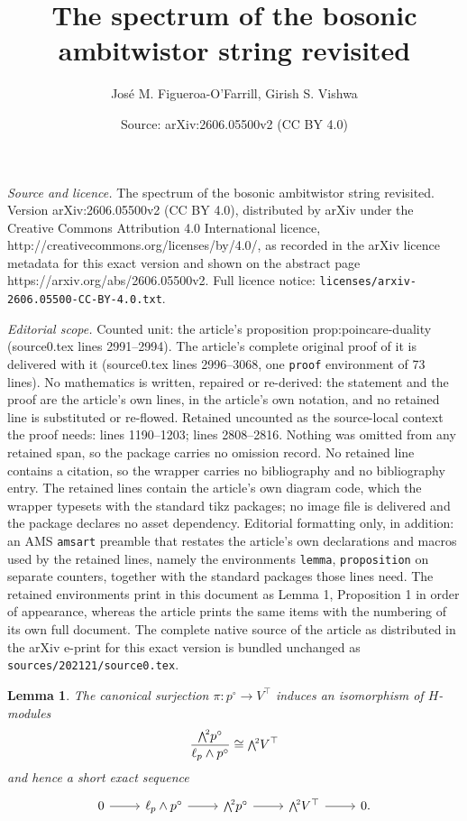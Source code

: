 \documentclass[10pt,a4paper]{amsart}
\title{The spectrum of the bosonic ambitwistor string revisited}
\author{Jos\'e M. Figueroa-O'Farrill, Girish S. Vishwa}
\date{Source: arXiv:2606.05500v2 (CC BY 4.0)}
\newtheorem{lemma}{Lemma}
\newcommand\ext[1]{\scalebox{.85}{$\bigwedge^{\!#1}$}}
\begin{document}
\maketitle

\noindent\emph{Source and licence.} The spectrum of the bosonic ambitwistor string revisited. Version arXiv:2606.05500v2 (CC BY 4.0), distributed by arXiv under the Creative Commons Attribution 4.0 International licence, http://creativecommons.org/licenses/by/4.0/, as recorded in the arXiv licence metadata for this exact version and shown on the abstract page https://arxiv.org/abs/2606.05500v2. Full licence notice: \texttt{licenses/arxiv-2606.05500-CC-BY-4.0.txt}.\par\smallskip

\noindent\textit{Editorial scope.} Counted unit: the article's proposition prop:poincare-duality (source0.tex lines 2991--2994). The article's complete original proof of it is delivered with it (source0.tex lines 2996--3068, one \texttt{proof} environment of 73 lines). No mathematics is written, repaired or re-derived: the statement and the proof are the article's own lines, in the article's own notation, and no retained line is substituted or re-flowed.  Retained uncounted as the source-local context the proof needs: lines 1190--1203; lines 2808--2816.  Nothing was omitted from any retained span, so the package carries no omission record.  No retained line contains a citation, so the wrapper carries no bibliography and no bibliography entry.  The retained lines contain the article's own diagram code, which the wrapper typesets with the standard tikz packages; no image file is delivered and the package declares no asset dependency.  Editorial formatting only, in addition: an AMS \texttt{amsart} preamble that restates the article's own declarations and macros used by the retained lines, namely the environments \texttt{lemma}, \texttt{proposition} on separate counters, together with the standard packages those lines need.  The retained environments print in this document as Lemma 1, Proposition 1 in order of appearance, whereas the article prints the same items with the numbering of its own full document.  The complete native source of the article as distributed in the arXiv e-print for this exact version is bundled unchanged as \texttt{sources/202121/source0.tex}.
\begin{lemma}
  \label{lem:iso-h2rel-skewsymmetric}
  The canonical surjection $\pi : p^\circ \to V^\top$ induces an
  isomorphism of $H$-modules
  \begin{equation}
    \dfrac{\ext{2}p^\circ}{\ell_p \wedge p^\circ} \cong \ext{2}V^\top
  \end{equation}
  and hence a short exact sequence
  \begin{equation}
    \begin{tikzcd}
      0 \arrow[r] & \ell_p \wedge p^\circ \arrow[r] & \ext{2}p^\circ \arrow[r] & \ext{2} V^\top \arrow[r] & 0.
    \end{tikzcd}
  \end{equation}
\end{lemma}
\end{document}
